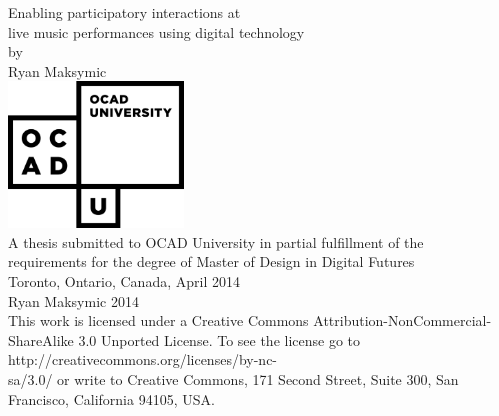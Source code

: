 \begin{titlepage}
\begin{center}

\LARGE{Enabling participatory interactions at\\live music performances using digital technology}\\[0.5cm]
\large{by\\[0.5cm]
Ryan Maksymic}\\[2cm]
\includegraphics[width=0.35\textwidth]{ocadu_logo.png}\\[1.5cm]
\small
A thesis submitted to OCAD University in partial fulfillment of the\\
requirements for the degree of Master of Design in Digital Futures\\[1cm]
Toronto, Ontario, Canada, April 2014\\[1cm]
\ccLogo \hspace{0.05cm} Ryan Maksymic 2014\\
This work is licensed under a Creative Commons Attribution-NonCommercial-ShareAlike 3.0 Unported License. To see the license go to http://creativecommons.org/licenses/by-nc-\\sa/3.0/ or write to Creative Commons, 171 Second Street, Suite 300, San Francisco, California 94105, USA.

\end{center}
\end{titlepage}